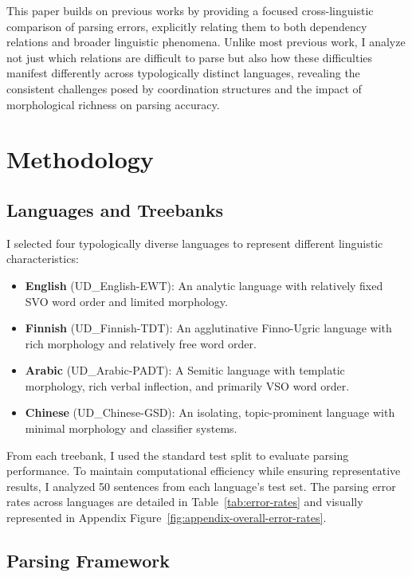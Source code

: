 \documentclass[11pt]{article}
\begin{document}
This paper builds on previous works by providing a focused cross-linguistic comparison of parsing errors, explicitly relating them to both dependency relations and broader linguistic phenomena. Unlike most previous work, I analyze not just which relations are difficult to parse but also how these difficulties manifest differently across typologically distinct languages, revealing the consistent challenges posed by coordination structures and the impact of morphological richness on parsing accuracy.

\section{Methodology}

\subsection{Languages and Treebanks}

I selected four typologically diverse languages to represent different linguistic characteristics:

\begin{itemize}
    \item \textbf{English} (UD\_English-EWT): An analytic language with relatively fixed SVO word order and limited morphology.
    \item \textbf{Finnish} (UD\_Finnish-TDT): An agglutinative Finno-Ugric language with rich morphology and relatively free word order.
    \item \textbf{Arabic} (UD\_Arabic-PADT): A Semitic language with templatic morphology, rich verbal inflection, and primarily VSO word order.
    \item \textbf{Chinese} (UD\_Chinese-GSD): An isolating, topic-prominent language with minimal morphology and classifier systems.
\end{itemize}

From each treebank, I used the standard test split to evaluate parsing performance. To maintain computational efficiency while ensuring representative results, I analyzed 50 sentences from each language's test set. The parsing error rates across languages are detailed in Table~\ref{tab:error-rates} and visually represented in Appendix Figure~\ref{fig:appendix-overall-error-rates}.

\subsection{Parsing Framework}
\end{document}
